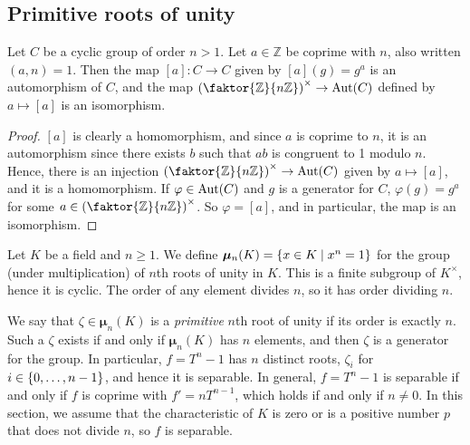 \subsection{Primitive roots of unity}
\begin{lemma}
	Let \( C \) be a cyclic group of order \( n > 1 \).
	Let \( a \in \mathbb Z \) be coprime with \( n \), also written \( (a,n) = 1 \).
	Then the map \( [a] \colon C \to C \) given by \( [a](g) = g^a \) is an automorphism of \( C \), and the map \( \qty(\faktor{\mathbb Z}{n\mathbb Z})^\times \to \Aut(C) \) defined by \( a \mapsto [a] \) is an isomorphism.
\end{lemma}
\begin{proof}
	\( [a] \) is clearly a homomorphism, and since \( a \) is coprime to \( n \), it is an automorphism since there exists \( b \) such that \( ab \) is congruent to 1 modulo \( n \).
	Hence, there is an injection \( \qty(\faktor{\mathbb Z}{n\mathbb Z})^\times \to \Aut(C) \) given by \( a \mapsto [a] \), and it is a homomorphism.
	If \( \varphi \in \operatorname{Aut}(C) \) and \( g \) is a generator for \( C \), \( \varphi(g) = g^a \) for some \( a \in \qty(\faktor{\mathbb Z}{n\mathbb Z})^\times \).
	So \( \varphi = [a] \), and in particular, the map is an isomorphism.
\end{proof}
Let \( K \) be a field and \( n \geq 1 \).
We define \( \bm \mu_n(K) = \qty{x \in K \mid x^n = 1} \) for the group (under multiplication) of \( n \)th roots of unity in \( K \).
This is a finite subgroup of \( K^\times \), hence it is cyclic.
The order of any element divides \( n \), so it has order dividing \( n \).

We say that \( \zeta \in \bm \mu_n(K) \) is a \emph{primitive} \( n \)th root of unity if its order is exactly \( n \).
Such a \( \zeta \) exists if and only if \( \bm \mu_n(K) \) has \( n \) elements, and then \( \zeta \) is a generator for the group.
In particular, \( f = T^n - 1 \) has \( n \) distinct roots, \( \zeta_i \) for \( i \in \qty{0, \dots, n-1} \), and hence it is separable.
In general, \( f = T^n - 1 \) is separable if and only if \( f \) is coprime with \( f' = nT^{n-1} \), which holds if and only if \( n \neq 0 \).
In this section, we assume that the characteristic of \( K \) is zero or is a positive number \( p \) that does not divide \( n \), so \( f \) is separable.

